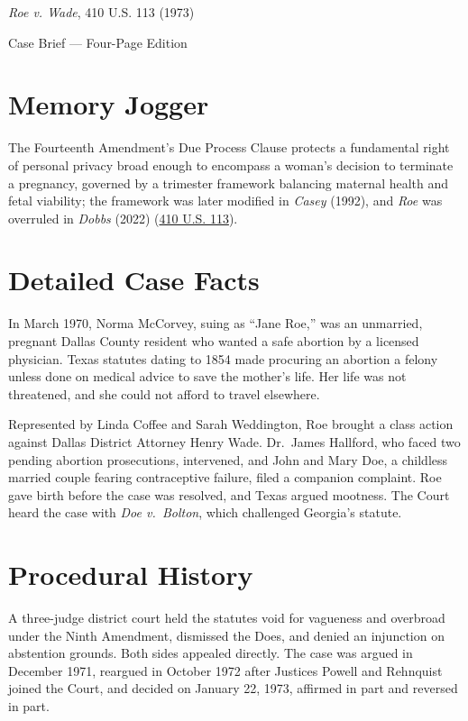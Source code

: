 \documentclass[12pt]{article}
\begin{document}
\begin{center}
{\LARGE \textit{Roe v. Wade}, 410 U.S. 113 (1973)\par}
\vspace{0.8em}
{\large Case Brief --- Four-Page Edition\par}
\end{center}
\vspace{1em}

\section{Memory Jogger}

The Fourteenth Amendment's Due Process Clause protects a fundamental right of personal privacy broad enough to encompass a woman's decision to terminate a pregnancy, governed by a trimester framework balancing maternal health and fetal viability; the framework was later modified in \textit{Casey} (1992), and \textit{Roe} was overruled in \textit{Dobbs} (2022) (\href{https://supreme.justia.com/cases/federal/us/410/113/}{410 U.S. 113}).

\section{Detailed Case Facts}

In March 1970, Norma McCorvey, suing as ``Jane Roe,'' was an unmarried, pregnant Dallas County resident who wanted a safe abortion by a licensed physician. Texas statutes dating to 1854 made procuring an abortion a felony unless done on medical advice to save the mother's life. Her life was not threatened, and she could not afford to travel elsewhere.

Represented by Linda Coffee and Sarah Weddington, Roe brought a class action against Dallas District Attorney Henry Wade. Dr.\ James Hallford, who faced two pending abortion prosecutions, intervened, and John and Mary Doe, a childless married couple fearing contraceptive failure, filed a companion complaint. Roe gave birth before the case was resolved, and Texas argued mootness. The Court heard the case with \textit{Doe v.\ Bolton}, which challenged Georgia's statute.

\section{Procedural History}

A three-judge district court held the statutes void for vagueness and overbroad under the Ninth Amendment, dismissed the Does, and denied an injunction on abstention grounds. Both sides appealed directly. The case was argued in December 1971, reargued in October 1972 after Justices Powell and Rehnquist joined the Court, and decided on January 22, 1973, affirmed in part and reversed in part.
\end{document}
